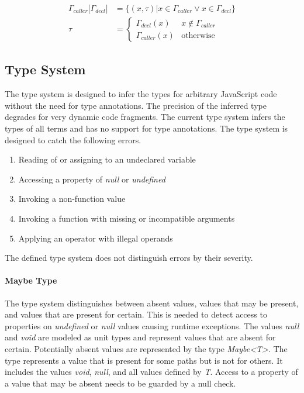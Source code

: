 \begin{align*}
	\Gamma_{caller}\Big\lbrack\Gamma_{decl}\Big\rbrack &= \lbrace (x, \tau) | x \in \Gamma_{caller} \vee x \in \Gamma_{decl} \rbrace \\
	\tau &= \begin{cases}
		\Gamma_{decl}(x) & x \notin \Gamma_{caller} \\
		\Gamma_{caller}(x) & \text{otherwise}
	\end{cases}
\end{align*}

\subsection{Type System}\label{sec:type-system}
The type system is designed to infer the types for arbitrary JavaScript code without the need for type annotations. The precision of the inferred type degrades for very dynamic code fragments. The current type system infers the types of all terms and has no support for type annotations. The type system is designed to catch the following errors.

\begin{enumerate}
	\item Reading of or assigning to an undeclared variable\label{item:absent-values}
	\item Accessing a property of \textit{null} or \textit{undefined}\label{item:nullable}
	\item Invoking a non-function value
	\item Invoking a function with missing or incompatible arguments
	\item Applying an operator with illegal operands\label{item:illegal-operands}
\end{enumerate}

The defined type system does not distinguish errors by their severity. 

\paragraph{Maybe Type}
The type system distinguishes between absent values, values that may be present, and values that are present for certain. This is needed to detect access to properties on \textit{undefined} or \textit{null} values causing runtime exceptions. The values \textit{null} and \textit{void} are modeled as unit types and represent values that are absent for certain. Potentially absent values are represented by the type \textit{Maybe\textless T\textgreater}. The type represents a value that is present for some paths but is not for others. It includes the values \textit{void}, \textit{null}, and all values defined by \textit{T}. Access to a property of a value that may be absent needs to be guarded by a null check.

